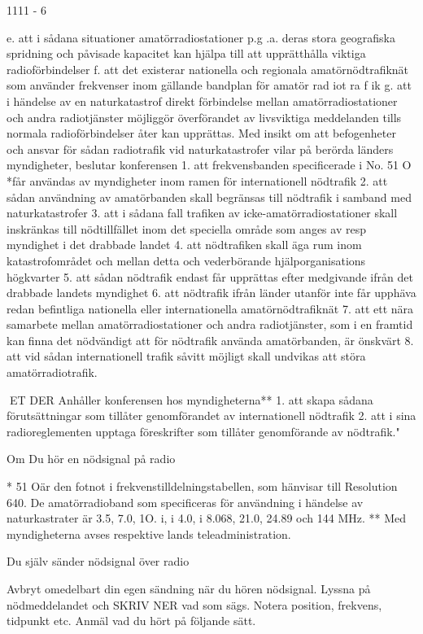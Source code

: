 \documentclass[a4paper,twoside,twocolumn,openright]{book}
\begin{document}
{{{{{1111 - 6

e. att i sådana situationer amatörradiostationer p.g .a. deras stora geografiska spridning och påvisade kapacitet kan hjälpa till
att upprätthålla viktiga radioförbindelser
f. att det existerar nationella och regionala
amatörnödtrafiknät som använder frekvenser inom gällande bandplan för amatör rad iot ra f ik
g. att i händelse av en naturkatastrof direkt
förbindelse mellan amatörradiostationer
och andra radiotjänster möjliggör överförandet av livsviktiga meddelanden tills
normala radioförbindelser åter kan upprättas.
Med insikt om att befogenheter och ansvar
för sådan radiotrafik vid naturkatastrofer vilar på berörda länders myndigheter, beslutar
konferensen
1. att frekvensbanden specificerade i No.
51 O *får användas av myndigheter inom
ramen för internationell nödtrafik
2. att sådan användning av amatörbanden
skall begränsas till nödtrafik i samband
med naturkatastrofer
3. att i sådana fall trafiken av icke-amatörradiostationer skall inskränkas till nödtillfället inom det speciella område som
anges av resp myndighet i det drabbade
landet
4. att nödtrafiken skall äga rum inom
katastrofområdet och mellan detta och
vederbörande hjälporganisations högkvarter
5. att sådan nödtrafik endast får upprättas
efter medgivande ifrån det drabbade landets myndighet
6. att nödtrafik ifrån länder utanför inte får
upphäva redan befintliga nationella eller
internationella amatörnödtrafiknät
7. att ett nära samarbete mellan amatörradiostationer och andra radiotjänster,
som i en framtid kan finna det nödvändigt
att för nödtrafik använda amatörbanden,
är önskvärt
8. att vid sådan internationell trafik såvitt
möjligt skall undvikas att störa amatörradiotrafik.

ET DER
Anhåller konferensen hos myndigheterna**
1. att skapa sådana förutsättningar som tillåter genomförandet av internationell nödtrafik
2. att i sina radioreglementen upptaga föreskrifter som tillåter genomförande av nödtrafik."

Om Du hör en nödsignal på radio

* 51 Oär den fotnot i frekvenstilldelningstabellen, som hänvisar till Resolution 640.
De amatörradioband som specificeras för
användning i händelse av naturkastrater
är 3.5, 7.0, 1O. i, i 4.0, i 8.068, 21.0, 24.89
och 144 MHz.
** Med myndigheterna avses respektive
lands teleadministration.

Du själv sänder nödsignal över radio

Avbryt omedelbart din egen sändning när du
hören nödsignal. Lyssna på nödmeddelandet
och SKRIV NER vad som sägs. Notera position, frekvens, tidpunkt etc. Anmäl vad du
hört på följande sätt.

}}}}}
\end{document}
